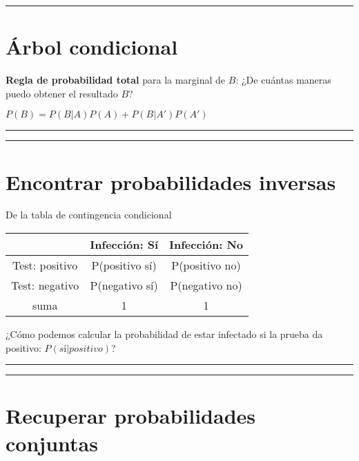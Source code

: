 \documentclass[
]{book}
\begin{document}
\begin{center}\rule{0.5\linewidth}{0.5pt}\end{center}

\hypertarget{uxe1rbol-condicional-1}{%
\section{Árbol condicional}\label{uxe1rbol-condicional-1}}

\textbf{Regla de probabilidad total} para la marginal de \(B\): ¿De cuántas maneras puedo obtener el resultado \(B\)?

\(P(B)=P(B|A)P(A)+P(B|A')P(A')\)

\begin{center}\rule{0.5\linewidth}{0.5pt}\end{center}

\begin{center}\rule{0.5\linewidth}{0.5pt}\end{center}

\hypertarget{encontrar-probabilidades-inversas}{%
\section{Encontrar probabilidades inversas}\label{encontrar-probabilidades-inversas}}

De la tabla de contingencia condicional

\begin{longtable}[]{@{}ccc@{}}
\toprule
& Infección: Sí & Infección: No \\
\midrule
\endhead
Test: positivo & P(positivo {\textbar{}} sí) & P(positivo {\textbar{}} no) \\
Test: negativo & P(negativo {\textbar{}} sí) & P(negativo {\textbar{}} no) \\
suma & 1 & 1 \\
\bottomrule
\end{longtable}

¿Cómo podemos calcular la probabilidad de estar infectado si la prueba da positivo: \(P(sí|positivo)\)?

\begin{center}\rule{0.5\linewidth}{0.5pt}\end{center}

\begin{center}\rule{0.5\linewidth}{0.5pt}\end{center}

\hypertarget{recuperar-probabilidades-conjuntas}{%
\section{Recuperar probabilidades conjuntas}\label{recuperar-probabilidades-conjuntas}}
\end{document}
